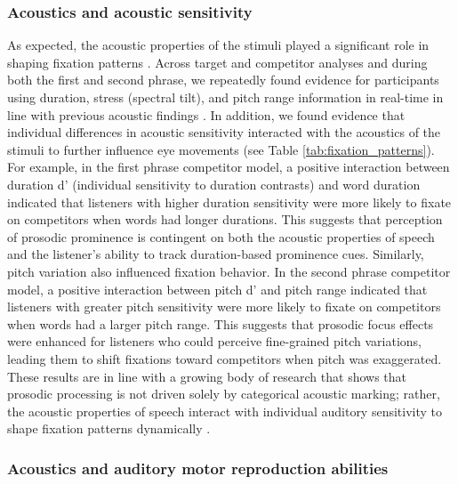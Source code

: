 \subsubsection{Acoustics and acoustic sensitivity}

As expected, the acoustic properties of the stimuli played a significant role in shaping fixation patterns \parencite{magnuson2019fixations}. Across target and competitor analyses and during both the first and second phrase, we repeatedly found evidence for participants using duration, stress (spectral tilt), and pitch range information in real-time in line with previous acoustic findings \cite{Breen2010,baumann2018makes}. In addition, we found evidence that individual differences in acoustic sensitivity interacted with the acoustics of the stimuli to further influence eye movements (see Table \ref{tab:fixation_patterns}). For example, in the first phrase competitor model, a positive interaction between duration d$’$ (individual sensitivity to duration contrasts) and word duration indicated that listeners with higher duration sensitivity were more likely to fixate on competitors when words had longer durations. This suggests that perception of prosodic prominence is contingent on both the acoustic properties of speech and the listener’s ability to track duration-based prominence cues. Similarly, pitch variation also influenced fixation behavior. In the second phrase competitor model, a positive interaction between pitch d’ and pitch range  indicated that listeners with greater pitch sensitivity were more likely to fixate on competitors when words had a larger pitch range. This suggests that prosodic focus effects were enhanced for listeners who could perceive fine-grained pitch variations, leading them to shift fixations toward competitors when pitch was exaggerated. These results are in line with a growing body of research that shows that prosodic processing is not driven solely by categorical acoustic marking; rather, the acoustic properties of speech interact with individual auditory sensitivity to shape fixation patterns dynamically \parencite{roy2017individual,ppcc,bramlett_wiener_24_speechprosody,jansen2023influence}.

\subsubsection{Acoustics and auditory motor reproduction abilities}

